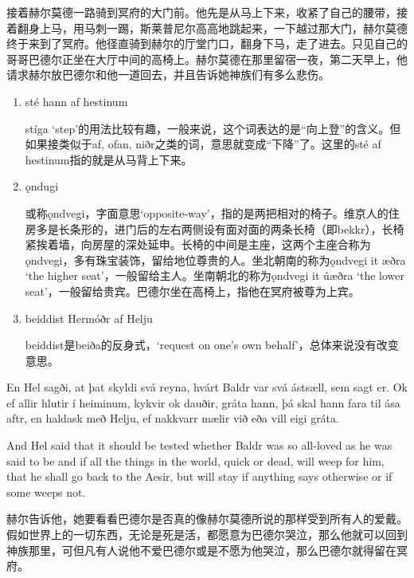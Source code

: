\begin{translation*}{}
  接着赫尔莫德一路骑到冥府的大门前。他先是从马上下来，收紧了自己的腰带，接着翻身上马，用马刺一踢，斯莱普尼尔高高地跳起来，一下越过那大门，赫尔莫德终于来到了冥府。他径直骑到赫尔的厅堂门口，翻身下马，走了进去。只见自己的哥哥巴德尔正坐在大厅中间的高椅上。赫尔莫德在那里留宿一夜，第二天早上，他请求赫尔放巴德尔和他一道回去，并且告诉她神族们有多么悲伤。
\end{translation*}
\begin{grammar*}{}
  \begin{enumerate}[leftmargin=*]
    \item sté hann af hestinum

          stíga `step'的用法比较有趣，一般来说，这个词表达的是“向上登”的含义。但如果接类似于af, ofan, niðr之类的词，意思就变成“下降”了。这里的sté af hestinum指的就是从马背上下来。

    \item ǫndugi

          或称ǫndvegi，字面意思`opposite-way'，指的是两把相对的椅子。维京人的住房多是长条形的，进门后的左右两侧设有面对面的两条长椅（即bekkr），长椅紧挨着墙，向房屋的深处延申。长椅的中间是主座，这两个主座合称为ǫndvegi，多有珠宝装饰，留给地位尊贵的人。坐北朝南的称为ǫndvegi it æðra `the higher seat'，一般留给主人。坐南朝北的称为ǫndvegi it úæðra `the lower seat'，一般留给贵宾。巴德尔坐在高椅上，指他在冥府被尊为上宾。

    \item beiddist Hermóðr af Helju

          beiddist是beiða的反身式，`request on one's own behalf'，总体来说没有改变意思。
  \end{enumerate}
\end{grammar*}
\begin{paracol}{2}
  En Hel sagði, at þat skyldi svá reyna, hvárt Baldr var svá ástsæll, sem sagt er. Ok ef allir hlutir í heiminum, kykvir ok dauðir, gráta hann, þá skal hann fara til ása aftr, en haldask með Helju, ef nakkvarr mælir við eða vill eigi gráta.

  \switchcolumn

  And Hel said that it should be tested whether Baldr was so all-loved as he was said to be and if all the things in the world, quick or dead, will weep for him, that he shall go back to the Aesir, but will stay if anything says otherwise or if some weeps not.
\end{paracol}
\begin{translation*}{}
  赫尔告诉他，她要看看巴德尔是否真的像赫尔莫德所说的那样受到所有人的爱戴。假如世界上的一切东西，无论是死是活，都愿意为巴德尔哭泣，那么他就可以回到神族那里，可但凡有人说他不爱巴德尔或是不愿为他哭泣，那么巴德尔就得留在冥府。
\end{translation*}
